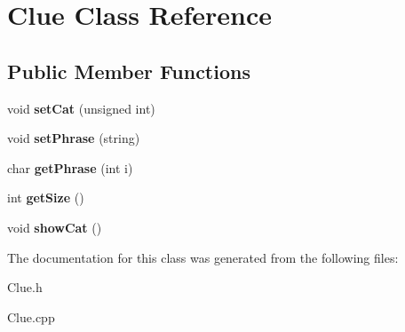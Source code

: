 \hypertarget{class_clue}{}\section{Clue Class Reference}
\label{class_clue}
\subsection*{Public Member Functions}
\begin{DoxyCompactItemize}
\item 
\hypertarget{class_clue_a5b4f0e5acadc421e342ba051ddd44f31}{}\label{class_clue_a5b4f0e5acadc421e342ba051ddd44f31} 
void {\bfseries set\+Cat} (unsigned int)
\item 
\hypertarget{class_clue_a6218cef7fc152cdda791e017f53ff2ce}{}\label{class_clue_a6218cef7fc152cdda791e017f53ff2ce} 
void {\bfseries set\+Phrase} (string)
\item 
\hypertarget{class_clue_a4026c0a49ed3fe8f51ccc739ed4c12a7}{}\label{class_clue_a4026c0a49ed3fe8f51ccc739ed4c12a7} 
char {\bfseries get\+Phrase} (int i)
\item 
\hypertarget{class_clue_aaef3a4bee9939abf3644d4215c3d507d}{}\label{class_clue_aaef3a4bee9939abf3644d4215c3d507d} 
int {\bfseries get\+Size} ()
\item 
\hypertarget{class_clue_ae330074934125b8033619fd1b225af89}{}\label{class_clue_ae330074934125b8033619fd1b225af89} 
void {\bfseries show\+Cat} ()
\end{DoxyCompactItemize}


The documentation for this class was generated from the following files\+:\begin{DoxyCompactItemize}
\item 
Clue.\+h\item 
Clue.\+cpp\end{DoxyCompactItemize}
